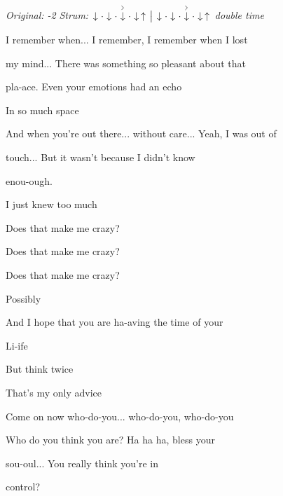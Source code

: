 \begin{song}


\begin{headerbox}
\RaiseBoxWithAccents
\textit{Original: -2} \quad
\textit{Strum:} $\Down\Miss\Down\Miss\AccentDown\Miss\Down\Up \Separator \Down\Miss\Down\Miss\AccentDown\Miss\Down\Up$ \textit{double time}
\end{headerbox}


\begin{chordbox}
\end{chordbox}

\bigskip

 I remember when... I remember, I remember when I lost \par
my mind... There was something so pleasant about that \par
pla-ace. Even your emotions had an echo \par
In so much space  \par

\bigskip

 And when you're out there... without care... Yeah, I was out of \par
{}touch... But it wasn't because I didn't know \par
enou-ough.  \par
I just knew too much  \par

\bigskip

Does that make me crazy? \par
Does that make me crazy? \par
Does that make me crazy? \par
Possibly  \par

\bigskip

 And I hope that you are ha-aving the time of your \par
{}Li-ife  \par
But think twice  \par
That's my only advice  \par

\bigskip

 Come on now who-do-you... who-do-you, who-do-you \par
Who do you think you are? Ha ha ha, bless your \par
sou-oul...  You really think you're in \par
control?  \par


\end{song}
